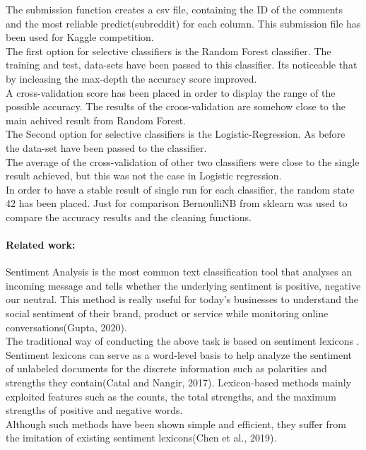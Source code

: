 \documentclass[12pt]{report}
\begin{document}
	The submission function creates a csv file, containing the ID of the comments and the most reliable predict(subreddit) for each column. This submission file has been used for Kaggle competition.\\
	
	The first option for selective classifiers is the Random Forest classifier. The training and test, data-sets have been passed to this classifier. Its noticeable that by incleasing the max-depth the accuracy score improved.\\
	
	A cross-validation score has been placed in order to display the range of the possible accuracy. The results of the croos-validation are somehow close to the main achived result from Random Forest.\\
	
	The Second option for selective classifiers is the Logistic-Regression. As before the data-set have been passed to the classifier. \\
	The average of the cross-validation of other two classifiers were close to the single result achieved, but this was not the case in Logistic regression.\\
	In order to have a stable result of single run for each classifier, the random state 42 has been placed. 
	Just for comparison BernoulliNB from sklearn was used to compare the accuracy results and the cleaning functions. 
	  
	
	
	\paragraph{Related work:}
	Sentiment Analysis is the most common text classification tool that analyses an incoming message and tells whether the underlying sentiment is positive, negative our neutral. This method is really useful for today's businesses to understand the social sentiment of their brand, product or service while monitoring online conversations(Gupta, 2020).\\
	
	The traditional way of conducting the above task is based on sentiment lexicons . Sentiment lexicons can serve as a word-level basis to help analyze the sentiment of unlabeled documents for the discrete information such as polarities and strengths they contain(Catal and Nangir, 2017). Lexicon-based methods mainly exploited features such as the counts, the total strengths, and the maximum strengths of positive and negative words.\\
	Although such methods have been shown simple and efficient, they suffer from the imitation of existing sentiment lexicons(Chen et al., 2019).\\
	
\end{document}
